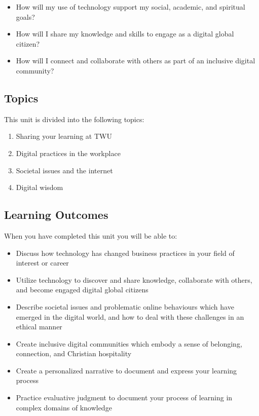 \documentclass[
  letterpaper,
  DIV=11,
  numbers=noendperiod]{scrreprt}
\providecommand{\tightlist}{%
  \setlength{\itemsep}{0pt}\setlength{\parskip}{0pt}}\usepackage{longtable,booktabs,array}
\begin{document}
\begin{itemize}
\tightlist
\item
  How will my use of technology support my social, academic, and
  spiritual goals?
\item
  How will I share my knowledge and skills to engage as a digital global
  citizen?
\item
  How will I connect and collaborate with others as part of an inclusive
  digital community?
\end{itemize}

\subsection*{Topics}\label{topics-5}

This unit is divided into the following topics:

\begin{enumerate}
\def\labelenumi{\arabic{enumi}.}
\tightlist
\item
  Sharing your learning at TWU
\item
  Digital practices in the workplace
\item
  Societal issues and the internet
\item
  Digital wisdom
\end{enumerate}

\subsection*{Learning Outcomes}\label{learning-outcomes-4}

When you have completed this unit you will be able to:

\begin{itemize}
\tightlist
\item
  Discuss how technology has changed business practices in your field of
  interest or career
\item
  Utilize technology to discover and share knowledge, collaborate with
  others, and become engaged digital global citizens
\item
  Describe societal issues and problematic online behaviours which have
  emerged in the digital world, and how to deal with these challenges in
  an ethical manner
\item
  Create inclusive digital communities which embody a sense of
  belonging, connection, and Christian hospitality
\item
  Create a personalized narrative to document and express your learning
  process
\item
  Practice evaluative judgment to document your process of learning in
  complex domains of knowledge
\end{itemize}
\end{document}
